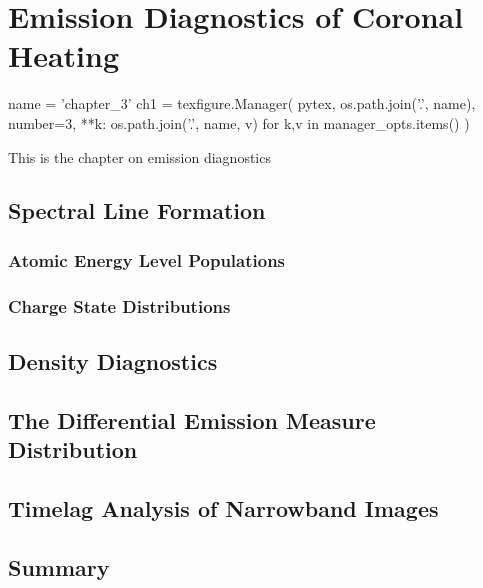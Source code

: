 \chapter{Emission Diagnostics of Coronal Heating}\label{ch:diagnostics}

\begin{pycode}[chapter_3]
name = 'chapter_3'
ch1 = texfigure.Manager(
    pytex,
    os.path.join('.', name),
    number=3,
    **{k: os.path.join('.', name, v) for k,v in manager_opts.items()}
)
\end{pycode}

This is the chapter on emission diagnostics

\section{Spectral Line Formation}

\subsection{Atomic Energy Level Populations}

\subsection{Charge State Distributions}

\section{Density Diagnostics}

\section{The Differential Emission Measure Distribution}

\section{Timelag Analysis of Narrowband Images}

\section{Summary}

